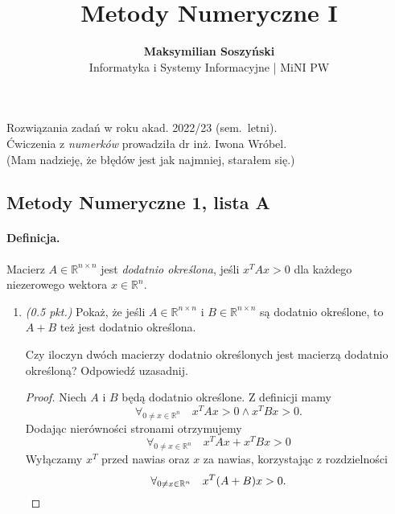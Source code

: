 \documentclass[12pt]{article}
\author{\textbf{Maksymilian Soszyński} \\ \textsf{Informatyka i Systemy Informacyjne | MiNI PW}}
\title{%
\textbf{Metody Numeryczne I}}
\date{}
\newcommand{\R}{\mathbb{R}}
\newenvironment{lista}[2][]{\newpage
\begin{center}
    \section[Lista \textbf{#2}]{Metody Numeryczne 1, lista #2}
\end{center}
\bigskip
#1
\begin{enumerate}[label=\textbf{#2\arabic*.}]}{\end{enumerate}}
\newcommand{\zad}[1][0.5]{\item \emph{(#1 pkt.) }}
\begin{document}
\maketitle
\begin{center}
    Rozwiązania zadań w roku akad. 2022/23 (sem.\ letni). \\
    Ćwiczenia z \emph{numerków} prowadziła dr inż. Iwona Wróbel. \\
    (Mam nadzieję, że błędów jest jak najmniej, starałem się.) \\
    \tableofcontents
    \thispagestyle{specialfooter}

\end{center}

\begin{lista}[\paragraph*{Definicja.} Macierz $A\in\R^{n\times n}$ jest \emph{dodatnio określona}, jeśli $x^TAx>0$ dla każdego niezerowego wektora $x\in\R^n$.]{A}
    \zad Pokaż, że jeśli $A\in\R^{n\times n}$ i $B\in\R^{n\times n}$ są dodatnio określone, to $A + B$ też jest dodatnio określona.

    Czy iloczyn dwóch macierzy dodatnio określonych jest macierzą dodatnio określoną? Odpowiedź uzasadnij.
    \begin{mdframed}
        \begin{proof}
            Niech $A$ i $B$ będą dodatnio określone. Z definicji mamy
            \[ \forall_{0\neq x\in\R^n} \quad x^TAx > 0 \land x^TBx > 0. \]
            Dodając nierówności stronami otrzymujemy
            \[ \forall_{0\neq x\in\R^n} \quad x^TAx + x^TBx > 0 \]
            Wyłączamy $x^T$ przed nawias oraz $x$ za nawias, korzystając z rozdzielności
            \[ \forall_{0\neq x\in\R^n} \quad x^T(A+B)x > 0. \qedhere \]
        \end{proof}



\end{mdframed}
\end{lista}
\end{document}
